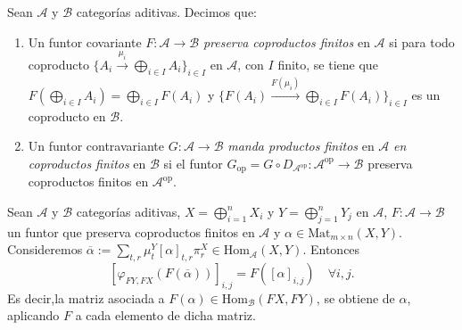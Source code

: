\documentclass[tesis]{subfiles}
\begin{document}
\begin{Def}\label{Def: Funtor que preserva coproductos finitos}
    Sean $\mathscr{A}$ y $\mathscr{B}$ categorías aditivas. Decimos que:

    \begin{enumerate}[label=(\alph*)]
    
        \item Un funtor covariante $F:\mathscr{A}\to \mathscr{B}$ \emph{preserva coproductos finitos} en $\mathscr{A}$ si para todo coproducto $\{A_i\xrightarrow[]{\mu_i} \bigoplus_{i\in I}A_i\}_{i\in I}$ en $\mathscr{A}$, con $I$ finito, se tiene que $F(\bigoplus_{i\in I}A_i) = \bigoplus_{i\in I}F(A_i)$ y $\big\{F(A_i)\xrightarrow[]{F(\mu_i)} \bigoplus_{i\in I}F(A_i)\big\}_{i\in I}$ es un coproducto en $\mathscr{B}$.

        \item Un funtor contravariante $G:\mathscr{A}\to \mathscr{B}$ \emph{manda productos finitos} en $\mathscr{A}$ \emph{en coproductos finitos} en $\mathscr{B}$ si el funtor $G_\text{op}=G\circ D_{\mathscr{A}^\text{op}}:\mathscr{A}^\text{op}\to \mathscr{B}$ preserva coproductos finitos en $\mathscr{A}^\text{op}$.
    \end{enumerate}
\end{Def}

\begin{Lema}\label{Mendoza-Ejer.52}
    Sean $\mathscr{A}$ y $\mathscr{B}$ categorías aditivas, $X =\bigoplus_{i=1}^n X_i$ y $Y=\bigoplus_{j=1}^n Y_j$ en $\mathscr{A}$, $F:\mathscr{A} \to \mathscr{B}$ un funtor que preserva coproductos finitos en $\mathscr{A}$ y $\alpha \in \text{Mat}_{m\times n}(X,Y).$ Consideremos $\overline{\alpha}:= \sum_{t,r} \mu_t^Y[\alpha]_{t,r}\pi_r^X \in \text{Hom}_{\mathscr{A}}(X,Y)$. Entonces
\[ [\varphi_{FY,FX}(F(\overline{\alpha}))]_{i,j} = F([\alpha]_{i,j}) \quad \forall i,j. \]
Es decir,la matriz asociada a $F(\alpha) \in \text{Hom}_{\mathscr{B}}(FX,FY)$, se obtiene de $\alpha$, aplicando $F$ a cada elemento de dicha matriz.
\end{Lema}
\end{document}
